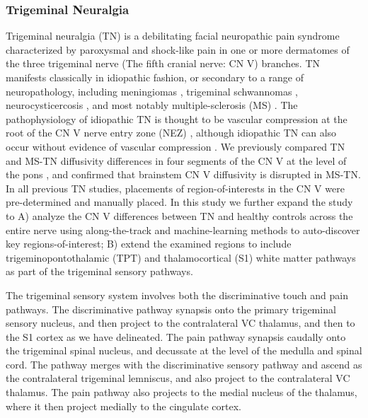\subsubsection{Trigeminal Neuralgia}
Trigeminal neuralgia (TN) is a debilitating facial neuropathic pain syndrome characterized by paroxysmal and shock-like pain in one or more dermatomes of the three trigeminal nerve (The fifth cranial nerve: CN V) branches. TN manifests classically in idiopathic fashion, or secondary to a range of neuropathology, including meningiomas \cite{Cheng2008}, trigeminal schwannomas \cite{Miller2008}, neurocysticercosis \cite{Revuelta1995}, and most notably multiple-sclerosis (MS) \cite{Cruccu2009,VanderMeijs2002,Nick2012}. The pathophysiology of idiopathic TN is thought to be vascular compression at the root of the CN V nerve entry zone (NEZ) \cite{Linn2011,Love2001}, although idiopathic TN can also occur without evidence of vascular compression \cite{Lee2014}. We previously compared TN and MS-TN diffusivity differences in four segments of the CN V at the level of the pons \cite{Chen2016a}, and confirmed that brainstem CN V diffusivity is disrupted in MS-TN. In all previous TN studies, placements of region-of-interests in the CN V were pre-determined and manually placed. In this study we further expand the study to A) analyze the CN V differences between TN and healthy controls across the entire nerve using along-the-track and machine-learning methods to auto-discover key regions-of-interest; B) extend the examined regions to include trigeminopontothalamic (TPT) and thalamocortical (S1) white matter pathways as part of the trigeminal sensory pathways.

The trigeminal sensory system involves both the discriminative touch and pain pathways. The discriminative pathway synapsis onto the primary trigeminal sensory nucleus, and then project to the contralateral VC thalamus, and then to the S1 cortex as we have delineated. The pain pathway synapsis caudally onto the trigeminal spinal nucleus, and decussate at the level of the medulla and spinal cord. The pathway merges with the discriminative sensory pathway and ascend as the contralateral trigeminal lemniscus, and also project to the contralateral VC thalamus. The pain pathway also projects to the medial nucleus of the thalamus, where it then project medially to the cingulate cortex. 

